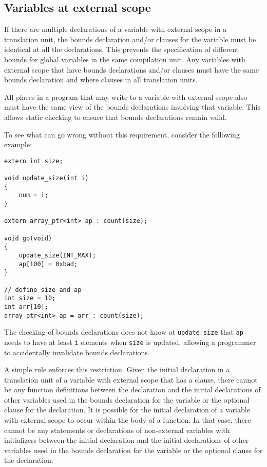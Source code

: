 \subsection{Variables at external scope}
\label{section:external-scope-variables}

If there are multiple declarations of a variable with external scope in
a translation unit, the bounds declaration and/or  clauses for the
variable must be identical at all the declarations. This prevents the
specification of different bounds for global variables in the same
compilation unit. Any variables with external scope that have bounds
declarations and/or  clauses must have the same bounds declaration
and where clauses in all translation units.

All places in a program that may write to a variable with external scope
also must have the same view of the bounds declarations involving that
variable. This allows static checking to ensure that bounds declarations
remain valid.

To see what can go wrong without this requirement, consider the
following example:

\begin{lstlisting}
extern int size;

void update_size(int i)
{
    num = i;
}

extern array_ptr<int> ap : count(size);

void go(void)
{
    update_size(INT_MAX);
    ap[100] = 0xbad;
}

// define size and ap
int size = 10;
int arr[10];
array_ptr<int> ap = arr : count(size);
\end{lstlisting}

The checking of bounds declarations does not know at
\texttt{update\_size} that \texttt{ap} needs to have at least \texttt{i}
elements when \texttt{size} is updated, allowing a programmer to accidentally
invalidate bounds declarations.

A simple rule enforces this restriction. Given the initial declaration
in a translation unit of a variable with external scope that has a
 clause, there cannot be any function definitions between
the declaration and the initial declarations of other variables used in
the bounds declaration for the variable or the optional  clause for the declaration.
It is possible for the initial declaration of
a variable with external scope to occur within the body of a function.
In that case, there cannot be any statements or declarations of
non-external variables with initializers between the initial declaration
and the initial declarations of other variables used in the
bounds declaration for the variable or the optional  clause for
the declaration.

